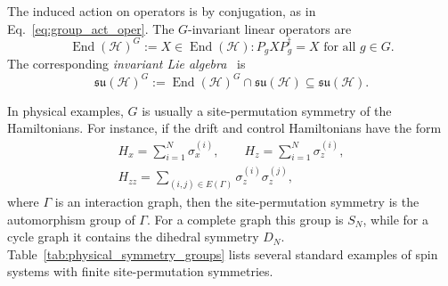 \documentclass[10pt,twocolumn,superscriptaddress,aps,amsmath,amssymb,citeautoscript,floatfix,prx]{revtex4-2}
\newcounter{alg}
\theoremstyle{plain}
\theoremstyle{plain}
\theoremstyle{plain}
\theoremstyle{plain}
\theoremstyle{plain}
\theoremstyle{plain}
\begin{document}
The induced action on operators is by conjugation, as in Eq.~\eqref{eq:group_act_oper}. The $G$-invariant linear operators are
$$
\operatorname{End}(\mathcal H)^G
:=
{
X\in\operatorname{End}(\mathcal H):
P_gXP_g^\dagger=X
\text{ for all } g\in G
}.
$$
The corresponding \textit{invariant Lie algebra}~\cite{DAlessandroHartwig2021, Albertini2020} is
$$
\mathfrak{su}(\mathcal H)^G
:=
\operatorname{End}(\mathcal H)^G
\cap
\mathfrak{su}(\mathcal H)
\subseteq
\mathfrak{su}(\mathcal H).
$$

In physical examples, $G$ is usually a site-permutation symmetry of the Hamiltonians. For instance, if the drift and control Hamiltonians have the form
$$
\begin{gathered}
H_x
=
\sum_{i=1}^N\sigma_x^{(i)},
\qquad
H_z
=
\sum_{i=1}^N\sigma_z^{(i)},
\\
H_{zz}
=
\sum_{(i,j)\in E(\Gamma)}
\sigma_z^{(i)}\sigma_z^{(j)},
\end{gathered}
$$
where $\Gamma$ is an interaction graph, then the site-permutation symmetry is the automorphism group of $\Gamma$. For a complete graph this group is $S_N$, while for a cycle graph it contains the dihedral symmetry $D_N$. Table~\ref{tab:physical_symmetry_groups} lists several standard examples of spin systems with finite site-permutation symmetries.
\end{document}
